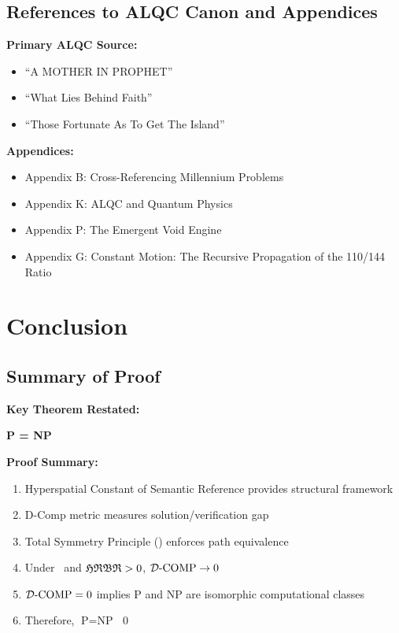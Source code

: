 \subsection{References to ALQC Canon and Appendices}

\textbf{Primary ALQC Source:}
\begin{itemize}
    \item ``A MOTHER IN PROPHET''
    \item ``What Lies Behind Faith''
    \item ``Those Fortunate As To Get The Island''
\end{itemize}

\textbf{Appendices:}
\begin{itemize}
    \item Appendix B: Cross-Referencing Millennium Problems
    \item Appendix K: ALQC and Quantum Physics
    \item Appendix P: The Emergent Void Engine
    \item Appendix G: Constant Motion: The Recursive Propagation of the 110/144 Ratio
\end{itemize}

\section{Conclusion}

\subsection{Summary of Proof}

\textbf{Key Theorem Restated:}
\begin{theorem}[P = NP]
    \textbf{P = NP}
\end{theorem}

\textbf{Proof Summary:}
\begin{enumerate}
    \item Hyperspatial Constant of Semantic Reference provides structural framework
    \item D-Comp metric measures solution/verification gap
    \item Total Symmetry Principle (\TSP) enforces path equivalence
    \item Under \TSP\ and $\mathfrak{HRBR} > 0$, $\mathcal{D}\text{-}\mathrm{COMP} \to 0$
    \item $\mathcal{D}\text{-}\mathrm{COMP} = 0$ implies P and NP are isomorphic computational classes
    \item Therefore, $\text{P} = \text{NP}$ \qed
\end{enumerate}

